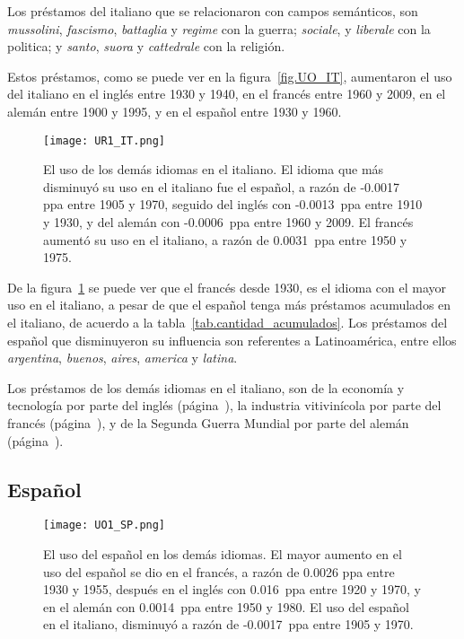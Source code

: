Los préstamos del italiano que se relacionaron con campos semánticos, son \textit{mussolini}, \textit{fascismo}, \textit{battaglia} y \textit{regime} con la guerra; \textit{sociale},  y \textit{liberale} con la politica;  y \textit{santo}, \textit{suora} y \textit{cattedrale} con la religión.

Estos préstamos, como se puede ver en la figura~\ref{fig.UO_IT}, aumentaron el uso del italiano en el inglés entre 1930 y 1940, en el francés entre 1960 y 2009, en el alemán entre 1900 y 1995, y en el español entre 1930 y 1960.
\label{IT-D}


\begin{figure}[h!]
	\centering
	\texttt{[image: UR1\_IT.png]}
	\caption{El uso de los demás idiomas en el italiano. El idioma que más 
	disminuyó su uso en el italiano fue el español, a razón de -0.0017 ppa entre 1905 y 1970, seguido del inglés con -0.0013~ppa entre 1910 y 1930, y del alemán con -0.0006~ppa entre 1960 y 2009. El francés aumentó su uso en el italiano, a razón de 0.0031~ppa entre 1950 y 1975.}
	\label{fig.UR_IT}
\end{figure}

De la figura~\ref{fig.UR_IT} se puede ver que el francés desde 1930, es el idioma con el mayor uso en el italiano, a pesar de que el español tenga más préstamos acumulados en el italiano, de acuerdo a la tabla~\ref{tab.cantidad_acumulados}. Los préstamos del español que disminuyeron su influencia son referentes a Latinoamérica, entre ellos  \textit{argentina}, \textit{buenos}, \textit{aires}, \textit{america} y \textit{latina}.

Los préstamos de los demás idiomas en el italiano, son de la economía y tecnología por parte del inglés (página~\pageref{EN-D}), la industria vitivinícola por parte del francés (página~\pageref{FR-D}), y de la Segunda Guerra Mundial por parte del alemán (página~\pageref{GE-D}).

\label{DE-IT}



\subsection{Español} %
\begin{figure}[h!] %
	\centering
	\texttt{[image: UO1\_SP.png]}
	\caption{El uso del español en los demás idiomas. El mayor aumento en el uso del español se dio en el francés, a razón de 0.0026 ppa entre 1930 y 1955, después en el inglés con 0.016~ppa entre 1920 y 1970,  y en el alemán con 0.0014~ppa entre 1950 y 1980. El uso del español en el italiano, disminuyó a razón de -0.0017~ppa entre 1905 y 1970.}
	\label{fig.UO_SP}
	
\end{figure} %

